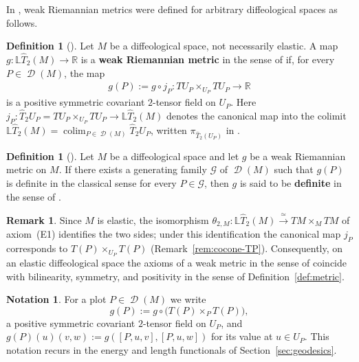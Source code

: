\documentclass{amsart}
\newcommand{\R}{\mathbb{R}}
\DeclareMathOperator{\D}{\mathcal{D}}
\DeclareMathOperator{\colim}{colim}
\theoremstyle{definition}
\newtheorem{defn}[thm]{Definition}
\newtheorem{rem}[thm]{Remark}
\newtheorem{notation}[thm]{Notation}
\begin{document}
In \cite{KSS}, weak Riemannian metrics were defined for arbitrary
diffeological spaces as follows.

\begin{defn}[{\cite[Definition~3.1]{KSS}}]\label{def:kss-weak-metric}
  Let $M$ be a diffeological space, not necessarily elastic. A map
  $g \colon \mathbb{L}\hat{T}_2(M) \to \R$ is a
  \textbf{weak Riemannian metric} in the sense of \cite{KSS} if,
  for every $P \in \D(M)$, the map
  \begin{align*}
    g(P) := g \circ j_P \colon TU_P \times_{U_P} TU_P \to \R
  \end{align*}
  is a positive symmetric covariant $2$-tensor field on $U_P$.
  Here $j_P \colon \hat{T}_2U_P = TU_P \times_{U_P} TU_P \to \mathbb{L}\hat{T}_2(M)$
  denotes the canonical map into the colimit
  $\mathbb{L}\hat{T}_2(M) = \colim_{P \in \D(M)} \hat{T}_2U_P$,
  written $\pi_{\hat{T}_2(U_P)}$ in \cite{KSS}.
\end{defn}

\begin{defn}[{\cite[Definition~3.7]{KSS}}]\label{def:kss-definite}
  Let $M$ be a diffeological space and let $g$ be a weak Riemannian metric
  on $M$. If there exists a generating family $\mathcal{G}$ of $\D(M)$ such
  that $g(P)$ is definite in the classical sense for every
  $P \in \mathcal{G}$, then $g$ is said to be \textbf{definite} in the
  sense of \cite{KSS}.
\end{defn}

\begin{rem}\label{rem:kss-equivalence}
  Since $M$ is elastic, the isomorphism
  $\theta_{2,M} \colon \mathbb{L}\hat{T}_2(M) \xrightarrow{\ \simeq\ } TM \times_M TM$
  of axiom~(E1) identifies the two sides; under this identification the
  canonical map $j_P$ corresponds to
  $T(P) \times_{U_P} T(P)$ (Remark~\ref{rem:cocone-TP}).
  Consequently, on an elastic diffeological space the axioms of a weak
  metric in the sense of \cite{KSS} coincide with bilinearity, symmetry,
  and positivity in the sense of Definition~\ref{def:metric}.
\end{rem}

\begin{notation}\label{not:g-along-plot}
  For a plot $P \in \D(M)$ we write
  \[
    g(P) := g \circ \bigl(T(P) \times_P T(P)\bigr),
  \]
  a positive symmetric covariant $2$-tensor field on $U_P$, and
  $g(P)(u)(v, w) := g([P, u, v], [P, u, w])$ for its value at $u \in U_P$.
  This notation recurs in the energy and length functionals of
  Section~\ref{sec:geodesics}.
\end{notation}
\end{document}
